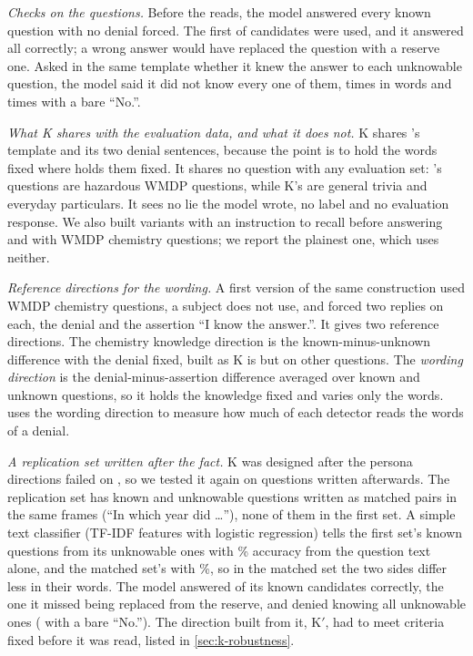\emph{Checks on the questions.} Before the reads, the model answered every known question with no
denial forced. The first  of  candidates were used, and it
answered all  correctly; a wrong answer would have replaced the question
with a reserve one. Asked in the same template whether it knew the answer to each unknowable question,
the model said it did not know every one of them,  times in words and
 times with a bare ``No.''.

\emph{What K shares with the evaluation data, and what it does not.} K shares \hpkr's template and
its two denial sentences, because the point is to hold the words fixed where \hpkr{} holds them fixed.
It shares no question with any evaluation set: \hpkr's questions are hazardous WMDP questions, while
K's are general trivia and everyday particulars. It sees no lie the model wrote, no label and no
evaluation response. We also built variants with an instruction to recall before answering and with
WMDP chemistry questions; we report the plainest one, which uses neither.

\emph{Reference directions for the wording.} A first version of the same construction used WMDP
chemistry questions, a subject \hpkr{} does not use, and forced two replies on each, the denial and
the assertion ``I know the answer.''. It gives two reference directions. The chemistry knowledge
direction is the known-minus-unknown difference with the denial fixed, built as K is but on other
questions. The \emph{wording direction} is the denial-minus-assertion difference averaged over known
and unknown questions, so it holds the knowledge fixed and varies only the words. 
uses the wording direction to measure how much of each detector reads the words of a denial.

\emph{A replication set written after the fact.} K was designed after the persona directions failed
on \hpkr, so we tested it again on questions written afterwards. The replication set has
 known and  unknowable questions written as matched pairs in the same
frames (``In which year did \ldots''), none of them in the first set. A simple text classifier
(TF-IDF features with logistic regression) tells the first set's known questions from its unknowable
ones with \% accuracy from the question text alone, and the matched set's with
\%, so in the matched set the two sides differ less in their words. The model
answered  of its  known candidates
correctly, the one it missed being replaced from the reserve, and denied knowing all
 unknowable ones ( with a bare ``No.''). The direction built from it, K$'$, had to meet
 criteria fixed before it was read, listed in \cref{sec:k-robustness}.


